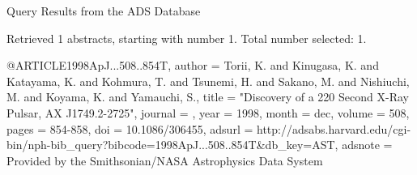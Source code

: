Query Results from the ADS Database


Retrieved 1 abstracts, starting with number 1.  Total number selected: 1.

@ARTICLE{1998ApJ...508..854T,
   author = {{Torii}, K. and {Kinugasa}, K. and {Katayama}, K. and {Kohmura}, T. and 
	{Tsunemi}, H. and {Sakano}, M. and {Nishiuchi}, M. and {Koyama}, K. and 
	{Yamauchi}, S.},
    title = "{Discovery of a 220 Second X-Ray Pulsar, AX J1749.2-2725}",
  journal = {\apj},
     year = 1998,
    month = dec,
   volume = 508,
    pages = {854-858},
      doi = {10.1086/306455},
   adsurl = {http://adsabs.harvard.edu/cgi-bin/nph-bib_query?bibcode=1998ApJ...508..854T&db_key=AST},
  adsnote = {Provided by the Smithsonian/NASA Astrophysics Data System}
}


